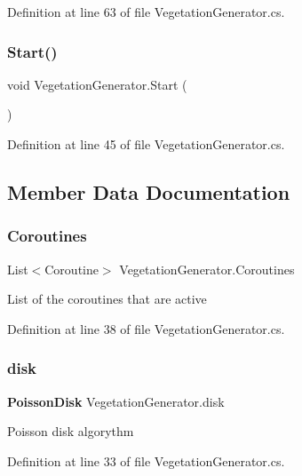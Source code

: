 Definition at line 63 of file Vegetation\+Generator.\+cs.

\mbox{\label{class_vegetation_generator_a5c7e497cbd87ae74ee12c87608de1744}} 
\subsubsection{Start()}
{\footnotesize\ttfamily void Vegetation\+Generator.\+Start (\begin{DoxyParamCaption}{ }\end{DoxyParamCaption})}



Definition at line 45 of file Vegetation\+Generator.\+cs.



\subsection{Member Data Documentation}
\mbox{\label{class_vegetation_generator_acb98b6e4d606e6a1db485f6e57dd5199}} 
\subsubsection{Coroutines}
{\footnotesize\ttfamily List$<$Coroutine$>$ Vegetation\+Generator.\+Coroutines}



List of the coroutines that are active 



Definition at line 38 of file Vegetation\+Generator.\+cs.

\mbox{\label{class_vegetation_generator_ad20b57f637f32c7cb9eebd0c20f2cccd}} 
\subsubsection{disk}
{\footnotesize\ttfamily \textbf{ Poisson\+Disk} Vegetation\+Generator.\+disk}



Poisson disk algorythm 



Definition at line 33 of file Vegetation\+Generator.\+cs.

